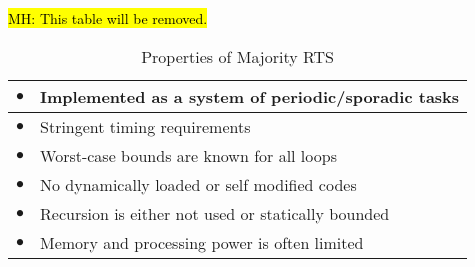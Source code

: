 \hl{MH: This table will be removed.}
\begin{table}[h t b] 
\centering
\caption{Properties of Majority RTS}
\label{tab:rts}
\begin{tabular}{|c p{6.5cm}|} \hline
$\bullet$ & Implemented as a system of periodic/sporadic tasks\\ \hline
$\bullet$ &  Stringent timing requirements\\ \hline
$\bullet$ & Worst-case bounds are known for all loops \\ \hline
$\bullet$ & No dynamically loaded or self modified codes \\ \hline
$\bullet$ & Recursion is either not used or statically bounded \\ \hline
$\bullet$ & Memory and processing power is often limited \\
\hline\end 
{tabular}
\end{table}



% 